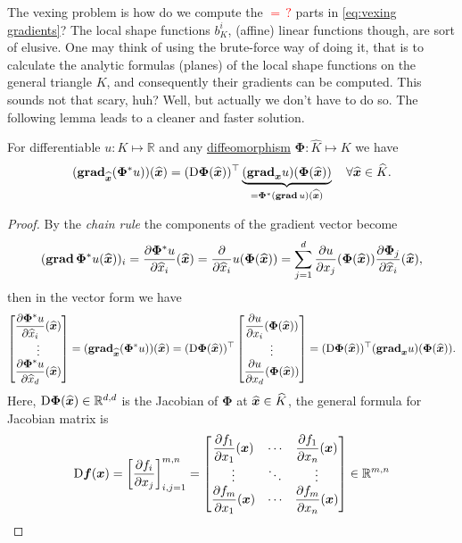 	The vexing problem is how do we compute the \textcolor{red}{$=\,?$} parts
	in \eqref{eq:vexing gradients}? The local shape functions $b_K^i$, (affine)
	linear functions though, are sort of elusive. One may think of using the 
	brute-force way of doing it, that is to calculate the analytic formulas
	(planes) of the local shape functions on the general triangle $K$, and 
	consequently their gradients can be computed. This sounds not that scary, 
	huh? Well, but actually we don't have to do so. The following lemma leads
	to a cleaner and faster solution.
	\begin{lemma}
	For differentiable $u:K\mapsto\mathbb{R}$ and any 
	\href{https://en.wikipedia.org/wiki/Diffeomorphism}{diffeomorphism}
	$\bm{\Phi}:\widehat{K}\mapsto K$ we have
	\[(\mathbf{grad}_{\widehat{\bm{x}}}(\bm{\Phi}^* u))(\widehat{\bm{x}})=
	(\mathrm{D}\bm{\Phi}(\widehat{\bm{x}}))^\top
	\underbrace{(\mathbf{grad}_{\bm{x}} u)(\bm{\Phi}(\widehat{\bm{x}}))}_{
	=\bm{\Phi}^* (\mathbf{grad}\, u)(\widehat{\bm{x}}) }
	\quad \forall \widehat{\bm{x}}\in\widehat{K}. \]	
	\end{lemma}
	\begin{proof}
	By the \emph{chain rule} the components of the gradient vector become
	\[(\mathbf{grad}\,\bm{\Phi}^* u(\widehat{\bm{x}}))_i = \frac{\partial\bm{\Phi}^* u}{
	\partial\widehat{x}_i}(\widehat{\bm{x}}) = 
	\frac{\partial}{\partial\widehat{x}_i} u (\bm{\Phi}(\widehat{\bm{x}}))=
	\sum_{j=1}^{d}\frac{\partial u}{\partial x_j} (\bm{\Phi}(\widehat{\bm{x}}))
	\frac{\partial\bm{\Phi}_j}{\partial\widehat{x}_i}(\widehat{\bm{x}}),
	\]
	then in the vector form we have
	\[
	\begin{bmatrix}
		\dfrac{\partial\bm{\Phi}^* u}{\partial\widehat{x}_i}(\widehat{\bm{x}})\\
		\vdots\\
		\dfrac{\partial\bm{\Phi}^* u}{\partial\widehat{x}_d}(\widehat{\bm{x}})
	\end{bmatrix}=
	(\mathbf{grad}_{\widehat{\bm{x}}}(\bm{\Phi}^* u))(\widehat{\bm{x}})=
	(\mathrm{D}\bm{\Phi}(\widehat{\bm{x}}))^\top
	\begin{bmatrix}
		\dfrac{\partial u}{\partial x_i}(\bm{\Phi}(\widehat{\bm{x}}))\\		
		\vdots\\
		\dfrac{\partial u}{\partial x_d}(\bm{\Phi}(\widehat{\bm{x}}))
	\end{bmatrix}=
	(\mathrm{D}\bm{\Phi}(\widehat{\bm{x}}))^\top
	(\mathbf{grad}_{\bm{x}} u)(\bm{\Phi}(\widehat{\bm{x}})).\]
	Here, $\mathrm{D}\bm{\Phi}(\widehat{\bm{x}})\in\mathbb{R}^{d,d}$ is the 
	Jacobian of $\bm{\Phi}$ at $\widehat{\bm{x}}\in\widehat{K}$, the general 
	formula for Jacobian matrix is
	\[\mathrm{D}\bm{f}(\bm{x})=\left[\frac{\partial f_i}{\partial x_j}
	\right]_{i,j=1}^{m,n} = 
	\begin{bmatrix}
		\dfrac{\partial f_1}{\partial x_1}(\bm{x}) & \cdots & 
		\dfrac{\partial f_1}{\partial x_n}(\bm{x})\\
		\vdots &\ddots &\vdots \\
		\dfrac{\partial f_m}{\partial x_1}(\bm{x}) & \cdots &
		\dfrac{\partial f_m}{\partial x_n}(\bm{x})
	\end{bmatrix} \in\mathbb{R}^{m,n}
	\]
	\end{proof}
	
